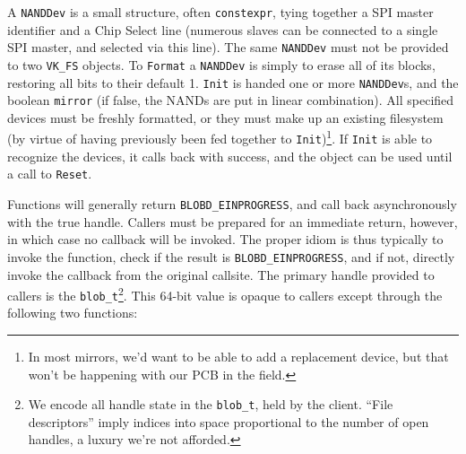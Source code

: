 \documentclass[letterpaper,10pt]{article}
\begin{document}
A {\texttt{NANDDev}} is a small structure, often {\texttt{constexpr}}, tying
together a SPI master identifier and a Chip Select line (numerous slaves can be
connected to a single SPI master, and selected via this line). The same {\texttt{NANDDev}}
must not be provided to two {\texttt{VK\_FS}} objects. To {\texttt{Format}} a
\texttt{NANDDev} is simply to erase all of its blocks, restoring all bits to their default
1. {\texttt{Init}} is handed one or more {\texttt{NANDDev}}s, and the boolean
{\texttt{mirror}} (if false, the NANDs are put in linear combination). All
specified devices must be freshly formatted, or they must make up an existing
filesystem (by virtue of having previously been fed together to
{\texttt{Init}})\footnote{In most mirrors, we'd want to be able to add a
  replacement device, but that won't be happening with our PCB in the field.}.
If {\texttt{Init}} is able to recognize the devices, it calls back with
success, and the object can be used until a call to {\texttt{Reset}}.

Functions will generally return {\texttt{BLOBD\_EINPROGRESS}}, and call back
asynchronously with the true handle. Callers must be prepared for an immediate
return, however, in which case no callback will be invoked. The proper idiom
is thus typically to invoke the function, check if the result is
{\texttt{BLOBD\_EINPROGRESS}}, and if not, directly invoke the callback
from the original callsite. The primary handle provided to callers is the
{\texttt{blob\_t}}\footnote{We encode all handle state in the \texttt{blob\_t},
  held by the client. ``File descriptors'' imply indices into space
  proportional to the number of open handles, a luxury we're not afforded.}.
This 64-bit value is opaque to callers except through the following two
functions:
\end{document}
